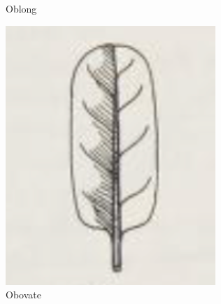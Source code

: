 \documentclass[12pt,english]{article}
\begin{document}
\begin{figure}[!hbt]
\begin{centre}
	\begin{minipage}{0.19\textwidth}
		\caption{Oblong}
		\includegraphics[width=\textwidth]{../code/contour/original/oblong}
	\end{minipage}
	\begin{minipage}{0.19\textwidth}
		\caption{Obovate}

\end{minipage}
\end{centre}
\end{figure}
\end{document}
